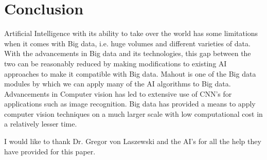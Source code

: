 \documentclass[sigconf]{acmart}
\begin{document}
\section{Conclusion}
Artificial Intelligence with its ability to take over the world has some limitations when it comes with Big data, i.e. huge volumes and different varieties of data. With the advancements in Big data and its technologies, this gap between the two can be reasonably reduced by making modifications to existing AI approaches to make it compatible with Big data. Mahout is one of the Big data modules by which we can apply many of the AI algorithms to Big data. Advancements in Computer vision has led to extensive use of CNN's for applications such as image recognition. Big data has provided a means to apply computer vision techniques on a much larger scale with low computational cost in a relatively lesser time. 

\begin{acks}
I would like to thank Dr. Gregor von Laszewski and the AI's for all the help they have provided for this paper.

\end{acks}


 
\end{document}
